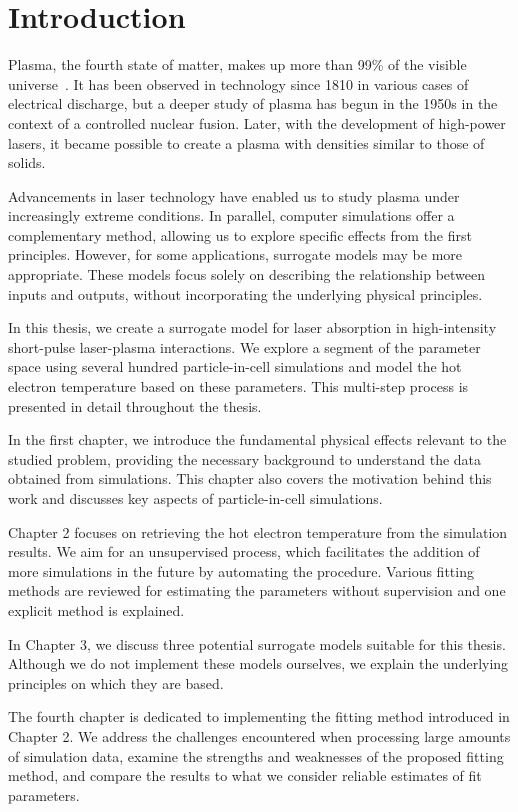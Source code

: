 \chapter*{Introduction}


Plasma, the fourth state of matter, makes up more than 99\% of the visible universe~\cite{plasma-intro}. It has been observed in technology since 1810 in various cases of electrical discharge, but a deeper study of plasma has begun in the 1950s in the context of a controlled nuclear fusion. Later, with the development of high-power lasers, it became possible to create a plasma with densities similar to those of solids.

Advancements in laser technology have enabled us to study plasma under increasingly extreme conditions. In parallel, computer simulations offer a complementary method, allowing us to explore specific effects from the first principles. However, for some applications, surrogate models may be more appropriate. These models focus solely on describing the relationship between inputs and outputs, without incorporating the underlying physical principles.

In this thesis, we create a surrogate model for laser absorption in high-intensity short-pulse laser-plasma interactions. We explore a segment of the parameter space using several hundred particle-in-cell simulations and model the hot electron temperature based on these parameters. This multi-step process is presented in detail throughout the thesis.

In the first chapter, we introduce the fundamental physical effects relevant to the studied problem, providing the necessary background to understand the data obtained from simulations. This chapter also covers the motivation behind this work and discusses key aspects of particle-in-cell simulations.

Chapter 2 focuses on retrieving the hot electron temperature from the simulation results. We aim for an unsupervised process, which facilitates the addition of more simulations in the future by automating the procedure. Various fitting methods are reviewed for estimating the parameters without supervision and one explicit method is explained.

In Chapter 3, we discuss three potential surrogate models suitable for this thesis. Although we do not implement these models ourselves, we explain the underlying principles on which they are based.

The fourth chapter is dedicated to implementing the fitting method introduced in Chapter 2. We address the challenges encountered when processing large amounts of simulation data, examine the strengths and weaknesses of the proposed fitting method, and compare the results to what we consider reliable estimates of fit parameters.

